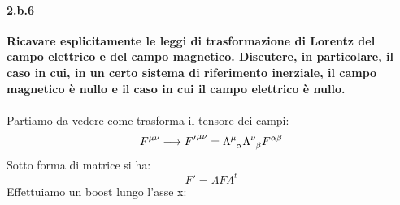 \documentclass[twoside]{article}
\begin{document}
\paragraph{2.b.6}\textbf{Ricavare esplicitamente le leggi di trasformazione di Lorentz del campo elettrico e del campo magnetico. Discutere, in particolare, il caso in cui, in un certo sistema di riferimento inerziale, il campo magnetico è nullo e il caso in cui il campo elettrico è nullo.}\\ \\
Partiamo da vedere come trasforma il tensore dei campi:
\begin{equation*}
    \tensor{F}{^{\mu\nu}}\longrightarrow\tensor{{F'}}{^{\mu\nu}}=\tensor{\Lambda}{^{\mu}_{\alpha}}\tensor{\Lambda}{^{\nu}_{\beta}}\tensor{F}{^{\alpha\beta}}
\end{equation*}
Sotto forma di matrice si ha:
\begin{equation*}
    F'=\Lambda F\Lambda^t
\end{equation*}
Effettuiamo un boost lungo l'asse x:
\end{document}
